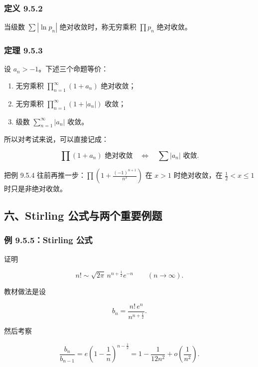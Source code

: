 \subsubsection*{定义 9.5.2}

当级数 \(\sum |\ln p_n|\) 绝对收敛时，称无穷乘积 \(\prod p_n\) 绝对收敛。

\subsubsection*{定理 9.5.3}

设 \(a_n>-1\)。下述三个命题等价：

\begin{enumerate}
 \item 无穷乘积 \(\prod_{n=1}^{\infty}(1+a_n)\) 绝对收敛；
 \item 无穷乘积 \(\prod_{n=1}^{\infty}(1+|a_n|)\) 收敛；
 \item 级数 \(\sum_{n=1}^{\infty}|a_n|\) 收敛。
 \end{enumerate}

所以对考试来说，可以直接记成：

\[
      \prod(1+a_n)\text{ 绝对收敛}
      \quad\Longleftrightarrow\quad
      \sum |a_n|\text{ 收敛}.
    \]

\begin{notebox}
把例 9.5.4 往前再推一步：\(\prod(1+\frac{(-1)^{n+1}}{n^x})\) 在 \(x>1\) 时绝对收敛，在 \(\frac12<x\le1\) 时只是非绝对收敛。
\end{notebox}

\subsection*{六、Stirling 公式与两个重要例题}

\subsubsection*{例 9.5.5：Stirling 公式}

证明

\[
      n!\sim \sqrt{2\pi}\,n^{n+\frac12}e^{-n}\qquad(n\to\infty).
    \]

教材做法是设

\[
      b_n=\frac{n!\,e^n}{n^{n+\frac12}}.
    \]

然后考察

\[
      \frac{b_n}{b_{n-1}}
      =
      e\left(1-\frac1n\right)^{n-\frac12}
      =
      1-\frac{1}{12n^2}+o\!\left(\frac1{n^2}\right).
    \]

